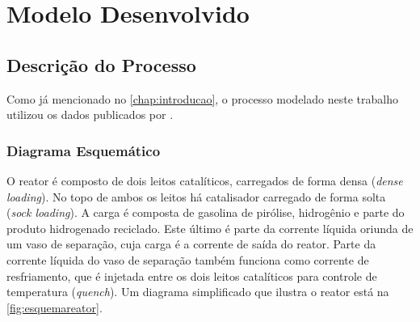 %
\chapter{Modelo Desenvolvido}
\label{chap:moddesenvolvidos}

\section{Descrição do Processo} \label{sec:descricaoprocesso}

Como já mencionado no \autoref{chap:introducao}, o processo modelado
neste trabalho utilizou os dados publicados por . 

\subsection{Diagrama Esquemático} \label{sec:diagramaesquematico}

O reator é composto de dois leitos catalíticos, carregados de forma densa
(\emph{dense loading}). No topo de ambos os leitos há catalisador carregado de
forma solta (\emph{sock loading}). A carga é composta de gasolina de pirólise,
hidrogênio e parte do produto hidrogenado reciclado. Este último é parte da
corrente líquida oriunda de um vaso de separação, cuja carga é a corrente de
saída do reator. Parte da corrente líquida do vaso de separação também funciona
como corrente de resfriamento, que é injetada entre os dois leitos catalíticos
para controle de temperatura (\emph{quench}). Um diagrama simplificado que
ilustra o reator está na \autoref{fig:esquemareator}.

